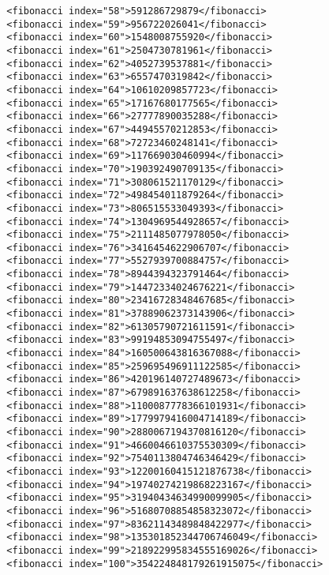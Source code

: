 \documentclass[11pt,english]{article}
\begin{document}
\begin{lstlisting}
  <fibonacci index="58">591286729879</fibonacci>
  <fibonacci index="59">956722026041</fibonacci>
  <fibonacci index="60">1548008755920</fibonacci>
  <fibonacci index="61">2504730781961</fibonacci>
  <fibonacci index="62">4052739537881</fibonacci>
  <fibonacci index="63">6557470319842</fibonacci>
  <fibonacci index="64">10610209857723</fibonacci>
  <fibonacci index="65">17167680177565</fibonacci>
  <fibonacci index="66">27777890035288</fibonacci>
  <fibonacci index="67">44945570212853</fibonacci>
  <fibonacci index="68">72723460248141</fibonacci>
  <fibonacci index="69">117669030460994</fibonacci>
  <fibonacci index="70">190392490709135</fibonacci>
  <fibonacci index="71">308061521170129</fibonacci>
  <fibonacci index="72">498454011879264</fibonacci>
  <fibonacci index="73">806515533049393</fibonacci>
  <fibonacci index="74">1304969544928657</fibonacci>
  <fibonacci index="75">2111485077978050</fibonacci>
  <fibonacci index="76">3416454622906707</fibonacci>
  <fibonacci index="77">5527939700884757</fibonacci>
  <fibonacci index="78">8944394323791464</fibonacci>
  <fibonacci index="79">14472334024676221</fibonacci>
  <fibonacci index="80">23416728348467685</fibonacci>
  <fibonacci index="81">37889062373143906</fibonacci>
  <fibonacci index="82">61305790721611591</fibonacci>
  <fibonacci index="83">99194853094755497</fibonacci>
  <fibonacci index="84">160500643816367088</fibonacci>
  <fibonacci index="85">259695496911122585</fibonacci>
  <fibonacci index="86">420196140727489673</fibonacci>
  <fibonacci index="87">679891637638612258</fibonacci>
  <fibonacci index="88">1100087778366101931</fibonacci>
  <fibonacci index="89">1779979416004714189</fibonacci>
  <fibonacci index="90">2880067194370816120</fibonacci>
  <fibonacci index="91">4660046610375530309</fibonacci>
  <fibonacci index="92">7540113804746346429</fibonacci>
  <fibonacci index="93">12200160415121876738</fibonacci>
  <fibonacci index="94">19740274219868223167</fibonacci>
  <fibonacci index="95">31940434634990099905</fibonacci>
  <fibonacci index="96">51680708854858323072</fibonacci>
  <fibonacci index="97">83621143489848422977</fibonacci>
  <fibonacci index="98">135301852344706746049</fibonacci>
  <fibonacci index="99">218922995834555169026</fibonacci>
  <fibonacci index="100">354224848179261915075</fibonacci>

\end{lstlisting}
\end{document}
